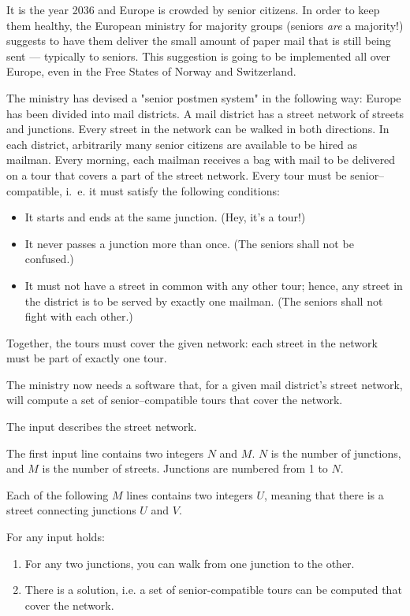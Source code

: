 \documentclass{boi2014}
\begin{document}
    It is the year 2036 and Europe is crowded by senior citizens. In order to
    keep them healthy, the European ministry for majority groups (seniors
    \emph{are} a majority!) suggests to have them deliver the small amount of
    paper mail that is still being sent --- typically to seniors. This
    suggestion is going to be implemented all over Europe, even in the Free
    States of Norway and Switzerland.

    The ministry has devised a "senior postmen system" in the following way:
    Europe has been divided into mail districts. A mail district has a street
    network of streets and junctions. Every street in the network can be walked
    in both directions. In each district, arbitrarily many senior citizens are
    available to be hired as mailman. Every morning, each mailman receives a bag
    with mail to be delivered on a tour that covers a part of the street
    network. Every tour must be senior--compatible, i.~e. it must satisfy the
    following conditions:

    \begin{itemize}
        \item It starts and ends at the same junction. (Hey, it’s a tour!)
        \item It never passes a junction more than once. (The seniors shall not
        be confused.)
        \item It must not have a street in common with any other tour; hence,
        any street in the district is to be served by exactly one mailman. (The
        seniors shall not fight with each other.)
    \end{itemize}

    Together, the tours must cover the given network: each street in the network
    must be part of exactly one tour.

    \Task
    The ministry now needs a software that, for a given mail district’s street
    network, will compute a set of senior--compatible tours that cover the
    network.

    \Input
    The input describes the street network.

    The first input line contains two integers $N$ and $M$. $N$ is the number of
    junctions, and $M$ is the number of streets. Junctions are numbered from 1
    to $N$.

    Each of the following $M$ lines contains two integers $U$, meaning that
    there is a street connecting junctions $U$ and $V$.

    For any input holds:
    \begin{enumerate}
        \item For any two junctions, you can walk from one junction to the other.
        \item There is a solution, i.e. a set of senior-compatible tours can be
        computed that cover the network.
    \end{enumerate}
\end{document}

